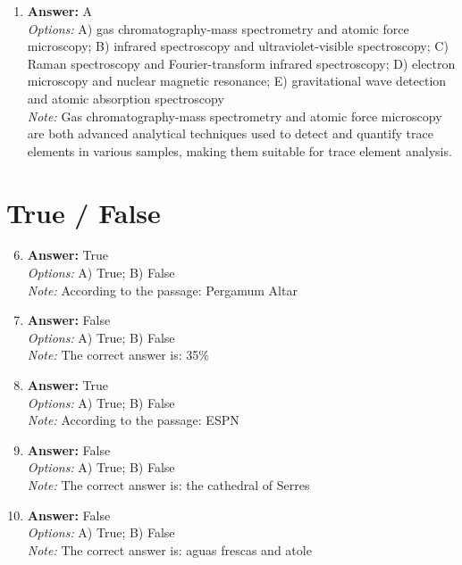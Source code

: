 \documentclass[12pt]{article}
\begin{document}
\begin{enumerate}[label=\arabic*.]
\\ \textit{Note:} The correct answer is supported by the fact that the Iberomaurusian culture, characterized by its unique stone tools and subsistence patterns, was gradually supplanted by the Capsian culture, which introduced new technological innovations and adaptations to changing environmental conditions in Holocene Africa.
\item \textbf{Answer:} A
\\ \textit{Options:} A) gas chromatography-mass spectrometry and atomic force microscopy; B) infrared spectroscopy and ultraviolet-visible spectroscopy; C) Raman spectroscopy and Fourier-transform infrared spectroscopy; D) electron microscopy and nuclear magnetic resonance; E) gravitational wave detection and atomic absorption spectroscopy
\\ \textit{Note:} Gas chromatography-mass spectrometry and atomic force microscopy are both advanced analytical techniques used to detect and quantify trace elements in various samples, making them suitable for trace element analysis.
\end{enumerate}

\section*{True / False}
\begin{enumerate}[label=\arabic*.]
\setcounter{enumi}{5}
\item \textbf{Answer:} True
\\ \textit{Options:} A) True; B) False
\\ \textit{Note:} According to the passage: Pergamum Altar
\item \textbf{Answer:} False
\\ \textit{Options:} A) True; B) False
\\ \textit{Note:} The correct answer is: 35\%
\item \textbf{Answer:} True
\\ \textit{Options:} A) True; B) False
\\ \textit{Note:} According to the passage: ESPN
\item \textbf{Answer:} False
\\ \textit{Options:} A) True; B) False
\\ \textit{Note:} The correct answer is: the cathedral of Serres
\item \textbf{Answer:} False
\\ \textit{Options:} A) True; B) False
\\ \textit{Note:} The correct answer is: aguas frescas and atole
\end{enumerate}
\end{document}
